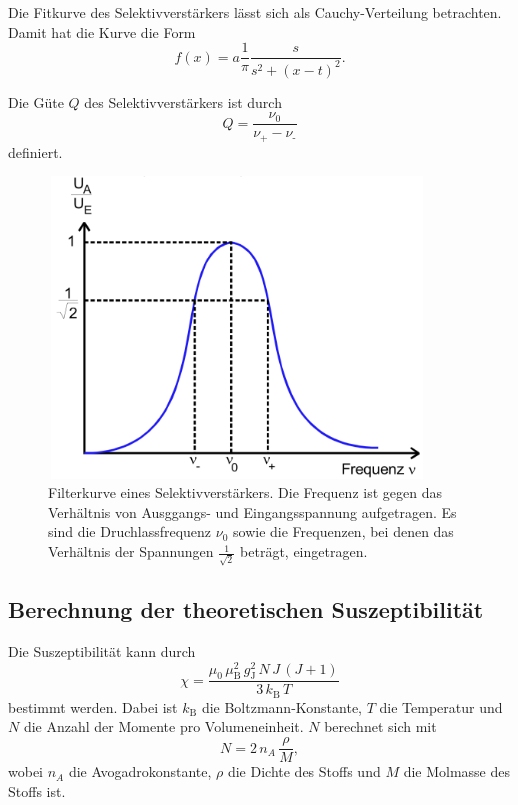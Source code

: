 \noindent Die Fitkurve des Selektivverstärkers lässt sich als Cauchy-Verteilung betrachten. Damit hat die Kurve die Form 
\begin{equation}
    f(x) = a \frac{1}{\pi} \frac{s}{s^2 + (x-t)^2}.
    \label{cauchyverteilung}
\end{equation}

\noindent Die Güte $Q$ des Selektivverstärkers ist durch
\begin{equation}
    Q = \frac{\nu_0}{\nu_\text{+} - \nu_\text{-}}
    \label{eqn:guete}
\end{equation}
definiert.

\begin{figure}
    \centering
    \includegraphics[width=10cm, height=8cm]{build/filterkurve.png}
    \caption{Filterkurve eines Selektivverstärkers. Die Frequenz ist gegen das
    Verhältnis von Ausggangs- und Eingangsspannung aufgetragen. Es sind die
    Druchlassfrequenz $\nu_0$ sowie die Frequenzen, bei denen das Verhältnis der
    Spannungen $\frac{1}{\sqrt{2}}$ beträgt, eingetragen. \cite{V606}}
    \label{abb:filterkurve}
\end{figure}


\subsection{Berechnung der theoretischen Suszeptibilität}
Die Suszeptibilität kann durch 
\begin{equation}
    \chi = \frac{\mu_0 \, \mu_\text{B}^2 \, g_\text{J}^2 \, N \, J \, (J+1)}{3 \, k_\text{B} \, T}
    \label{eqn:chitheo}
\end{equation}
bestimmt werden.
Dabei ist $k_\text{B}$ die Boltzmann-Konstante, $T$ die Temperatur und $N$ die Anzahl der 
Momente pro Volumeneinheit.
$N$ berechnet sich mit 
\begin{equation}
    N = 2 \, n_A \, \frac{\rho}{M},
    \label{N}
\end{equation}
wobei $n_A$ die Avogadrokonstante, $\rho$ die Dichte des Stoffs und $M$ die Molmasse des Stoffs ist. 

